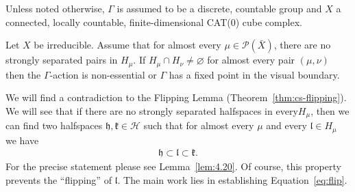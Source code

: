 Unless noted otherwise, \(\Gamma\) is assumed to be a discrete, countable group and \(X\) a connected, locally countable, finite-dimensional CAT(0) cube complex.



\begin{prop}[{\cite[Corollary~4.21]{MR3509968}}]
  \label{prop:4.21}
  Let \(X\) be irreducible. Assume that for almost every \(\mu \in \mathcal{P}(\bar X)\), there are no strongly separated pairs in \(H_\mu\). If \(H_\mu \cap H_\nu \neq \varnothing\) for almost every pair \((\mu, \nu)\) then the \(\Gamma\)-action is non-essential or \(\Gamma\) has a fixed point in the visual boundary.
\end{prop}

We will find a contradiction to the Flipping Lemma (Theorem~\ref{thm:cs-flipping}). We will see that if there are no strongly separated halfspaces in every\(H_\mu\), then we can find two halfspaces \(\mathfrak{h}, \mathfrak{k} \in \mathcal{H}\) such that for almost every \(\mu\) and every \(\mathfrak{l} \in H_\mu\) we have
\begin{align}
  \mathfrak{h} \subset \mathfrak{l} \subset \mathfrak{k}.\label{eq:flip}
\end{align}
For the precise statement please see Lemma~\ref{lem:4.20}. Of course, this property prevents the \enquote{flipping} of \(\mathfrak{l}\). The main work lies in establishing Equation~\eqref{eq:flip}.

